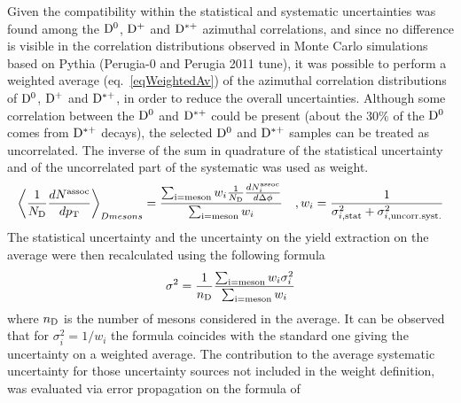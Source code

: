 %
%
%
%
Given the compatibility within the statistical and systematic uncertainties was found among the ${\rm D^0}$, ${\rm D^+}$ and ${\rm D^{*+}}$ azimuthal correlations, and since no difference is visible in the correlation distributions observed in Monte Carlo simulations based on Pythia (Perugia-0 and Perugia 2011 tune), %
it was possible to perform a weighted average (eq.~\ref{eqWeightedAv}) of the azimuthal correlation distributions of ${\rm D^0}$, ${\rm D^+}$ and ${\rm D^{*+}}$, in order to reduce the overall uncertainties. 
Although some correlation between the ${\rm D^0}$ and ${\rm D^{*+}}$ could be present (about the 30$\%$ of the ${\rm D^0}$ comes from ${\rm D^{*+}}$ decays), the selected ${\rm D^0}$ and
${\rm D^{*+}}$ samples can be treated as uncorrelated. The inverse of the sum in quadrature of the statistical uncertainty and of the uncorrelated part of the systematic was used as weight. %
\begin{equation}
  \left \langle \frac{1}{N_{\rm D}}\frac{dN^{\rm assoc}}{dp_{\rm T}} \right \rangle_{D mesons} =  \frac{\sum_{\rm i=meson}w_{i}\frac{1}{N_{\rm D}}\frac{dN^{\rm assoc}_{i}}{d\Delta\phi}}{\sum_{\rm i=meson}w_{i}}\quad , w_{i}=\frac{1}{\sigma^{2}_{i, \rm stat}+\sigma^{2}_{i, \rm uncorr. syst.}}
\label{eqWeightedAv}
\end{equation}
The statistical uncertainty and the uncertainty on the yield extraction on the average were then recalculated using the following formula 
\begin{equation}
  \sigma^{2}=\frac{1}{n_{\rm D}}\frac{\sum_{\rm i=meson}w_{i}\sigma^{2}_{i}}{\sum_{\rm i=meson}w_{i}}
\end{equation}
where $n_{\rm D}$ is the number of mesons considered in the average.
It can be observed that for $\sigma^{2}_{i}=1/w_{i}$ the formula coincides with the standard one giving the uncertainty on a weighted average.
The contribution to the average systematic uncertainty for those uncertainty sources
not included in the weight definition, was evaluated via error propagation on the formula of
